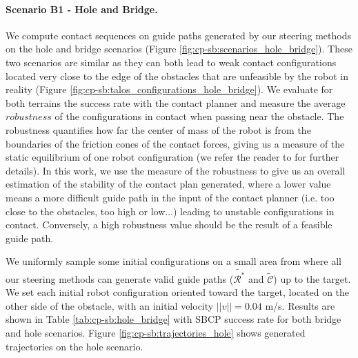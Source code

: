 \paragraph{Scenario B1 - Hole and Bridge.} 
We compute contact sequences on guide paths generated by our steering methods on the hole and bridge scenarios (Figure \ref{fig:cp-sb:scenarios_hole_bridge}). 
These two scenarios are similar as they can both lead to weak contact configurations located very close to the edge of the obstacles that are unfeasible by the robot in reality (Figure \ref{fig:cp-sb:talos_configurations_hole_bridge}).
We evaluate for both terrains the success rate with the contact planner and measure the average $robustness$ of the configurations in contact when passing near the obstacle.
The robustness quantifies how far the center of mass of the robot is from the boundaries of the friction cones of the contact forces, giving us a measure of the static equilibrium of one robot configuration (we refer the reader to \cite{AcyclicCP} for further details).
In this work, we use the measure of the robustness to give us an overall estimation of the stability of the contact plan generated, where a lower value means a more difficult guide path in the input of the contact planner (i.e. too close to the obstacles, too high or low...) leading to unstable configurations in contact.
Conversely, a high robustness value should be the result of a  feasible guide path.

 


We uniformly sample some initial configurations on a small area from where all our steering methods can generate valid guide paths ($\tilde{\mathcal{R}^*}$ and $\tilde{\mathcal{C}}$) up to the target.
We set each initial robot configuration oriented toward the target, located on the other side of the obstacle, with an initial velocity $||v||=0.04$ m/s.
Results are shown in Table \ref{tab:cp-sb:hole_bridge} with SBCP success rate for both bridge and hole scenarios. Figure \ref{fig:cp-sb:trajectories_hole} shows generated trajectories on the hole scenario.


